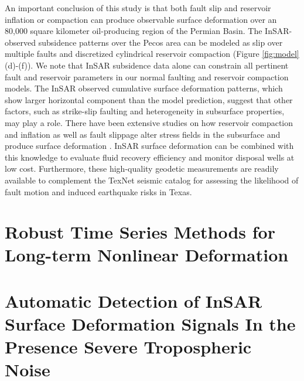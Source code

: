 \documentclass{utexasthesis}
\begin{document}
An important conclusion of this study is that both fault slip and reservoir inflation or compaction can produce observable surface deformation over an 80,000 square kilometer oil-producing region of the Permian Basin. The InSAR-observed subsidence patterns over the Pecos area can be modeled as slip over multiple faults and discretized cylindrical reservoir compaction (Figure \ref{fig:model} (d)-(f)). We note that InSAR subsidence data alone can constrain all pertinent fault and reservoir parameters in our normal faulting and reservoir compaction models. The InSAR observed cumulative surface deformation patterns, which show larger horizontal component than the model prediction, suggest that other factors, such as strike-slip faulting and heterogeneity in subsurface properties, may play a role. There have been extensive studies on how reservoir compaction and inflation as well as fault slippage alter stress fields in the subsurface and produce surface deformation \citep{Geertsma1973LandSubsidenceCompacting,Segall1992InducedStressesDue,Okada1992InternalDeformationDue,Du1992ComparisonVariousInversion,Vasco2005UseQuasiStatic,Vasco2008ReservoirMonitoringCharacterization,Khakim2012GeomechanicalModelingInsar}. InSAR surface deformation can be combined with this knowledge to evaluate fluid recovery efficiency and monitor disposal wells at low cost. Furthermore, these high-quality geodetic measurements are readily available to complement the TexNet seismic catalog for assessing the likelihood of fault motion and induced earthquake risks in Texas.





\chapter{Robust Time Series Methods for Long-term Nonlinear Deformation}
\label{CHAP:5-atmo-noise}

%
%
% 
% 
% 
% 



\chapter{Automatic Detection of InSAR Surface Deformation Signals In the Presence Severe Tropospheric Noise}
\end{document}
